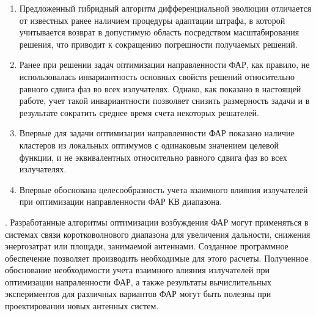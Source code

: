 \begin{enumerate}
  \item Предложенный гибридный алгоритм дифференциальной эволюции отличается от известных ранее наличием процедуры адаптации штрафа, в которой учитывается возврат в допустимую область посредством масштабирования решения, что приводит к сокращению погрешности получаемых решений.
  \item Ранее при решении задач оптимизации направленности ФАР, как правило, не использовалась инвариантность основных свойств решений относительно равного сдвига фаз во всех излучателях. Однако, как показано в настоящей работе, учет такой инвариантности позволяет снизить размерность задачи и в результате сократить среднее время счета некоторых решателей.
  \item Впервые для задачи оптимизации направленности ФАР  показано наличие кластеров из локальных оптимумов с одинаковым значением целевой функции, и не эквивалентных относительно равного сдвига фаз во всех излучателях.
  \item Впервые обоснована целесообразность учета взаимного влияния излучателей при оптимизации направленности ФАР КВ диапазона.
\end{enumerate}


{\influence}.
Разработанные алгоритмы оптимизации возбуждения ФАР могут  применяться в системах связи коротковолнового диапазона для увеличения дальности, снижения энергозатрат или площади, занимаемой антеннами. Созданное программное обеспечение позволяет производить необходимые для этого расчеты.
Полученное обоснование необходимости учета взаимного влияния излучателей при оптимизации напраленности ФАР, а также результаты вычислительных экспериментов для различных вариантов ФАР могут быть полезны при проектировании новых антенных систем.

